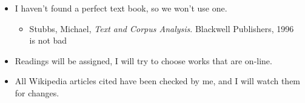 \documentclass[a4paper,landscape,headrule,footrule,xetex]{foils}
\begin{document}




\begin{itemize}
\item I haven't found a perfect text book, so we won't use one.
  \begin{itemize}
  \item Stubbs, Michael, \textit{Text and Corpus Analysis}. Blackwell Publishers, 1996
\\ is not bad
  \end{itemize}
\item Readings will be assigned, I will try to choose
  works that are on-line.
\item All Wikipedia articles cited have been checked by me, and I will watch
  them for changes. 
\end{itemize}








\end{document}
